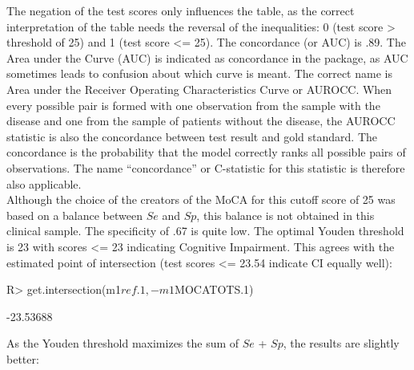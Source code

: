 \documentclass[
  nojss]{jss}
\begin{document}
The negation of the test scores only influences the table, as the
correct interpretation of the table needs the reversal of the
inequalities: 0 (test score \textgreater{} threshold of 25) and 1 (test
score \textless= 25). The concordance (or AUC) is .89. The Area under
the Curve (AUC) is indicated as concordance in the
 package, as AUC sometimes leads to confusion
about which curve is meant. The correct name is Area under the Receiver
Operating Characteristics Curve or AUROCC. When every possible pair is
formed with one observation from the sample with the disease and one
from the sample of patients without the disease, the AUROCC statistic is
also the concordance between test result and gold standard. The
concordance is the probability that the model correctly ranks all
possible pairs of observations. The name ``concordance'' or C-statistic
for this statistic is therefore also applicable.\\
Although the choice of the creators of the MoCA for this cutoff score of
25 was based on a balance between \(Se\) and \(Sp\), this balance is not
obtained in this clinical sample. The specificity of .67 is quite low.
The optimal Youden threshold is 23 with scores \textless= 23 indicating
Cognitive Impairment. This agrees with the estimated point of
intersection (test scores \textless= 23.54 indicate CI equally well):

\begin{CodeChunk}

\begin{CodeInput}
R> get.intersection(m1$ref.1, -m1$MOCATOTS.1)
\end{CodeInput}

\begin{CodeOutput}
[1] -23.53688
\end{CodeOutput}
\end{CodeChunk}

As the Youden threshold maximizes the sum of \(Se\) + \(Sp\), the
results are slightly better:
\end{document}
